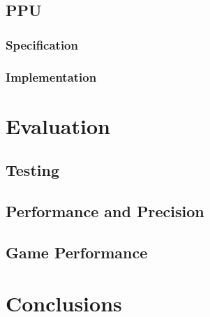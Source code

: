 \documentclass[]{report}
\begin{document}
\section{PPU}

\subsection{Specification}

\subsection{Implementation}

\chapter{Evaluation}

\section {Testing}

\section{Performance and Precision}

\section{Game Performance}

\chapter{Conclusions}

\printbibliography
\end{document}
